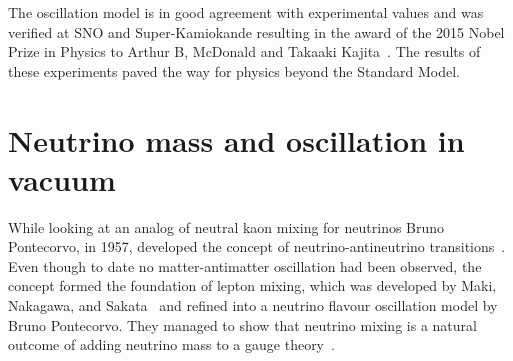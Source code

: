 The oscillation model is in good agreement with experimental values and was verified at SNO and Super-Kamiokande resulting in the award of the 2015 Nobel Prize in Physics to Arthur B, McDonald and Takaaki Kajita~\cite{95Nobel:Online}. The results of these experiments paved the way for physics beyond the Standard Model. %

\section{Neutrino mass and oscillation in vacuum}\label{subsection:Neutrinomassandoscillation}
While looking at an analog of neutral kaon mixing for neutrinos Bruno Pontecorvo, in 1957, developed the concept of neutrino-antineutrino transitions~\cite{11Pontecorvo}. Even though to date no matter-antimatter oscillation had been observed, the concept formed the foundation of lepton mixing, which was developed by Maki, Nakagawa, and Sakata~\cite{12Maki} and refined into a neutrino flavour oscillation model by Bruno Pontecorvo. They managed to show that neutrino mixing is a natural outcome of adding neutrino mass to a gauge theory~\cite{11Pontecorvo}.

